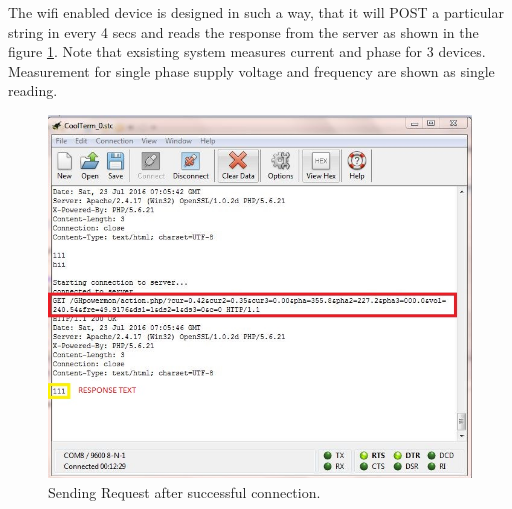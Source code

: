 \documentclass[a4paper,12pt,oneside]{book}
\begin{document}
The wifi enabled device is designed in such a way, that it will POST a particular string in every 4 secs and reads the response from the server as shown in the figure \ref{29}. Note that exsisting system measures current and phase for 3 devices. Measurement for single phase supply voltage and frequency are shown as single reading.   

\begin{figure}[H]
	\centering
	\includegraphics[width=15cm]{coolterm1.jpg}
	\caption{Sending Request after successful connection.}
	\label{29}
\end{figure}
\end{document}
